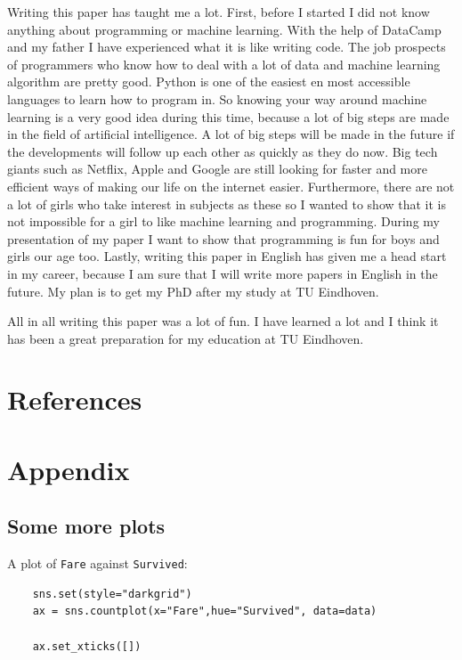 \documentclass[11pt]{article}
\begin{document}
Writing this paper has taught me a lot. First, before I started I did not know anything about programming or machine learning. With the help of DataCamp and my father I have experienced what it is like writing code. The job prospects of programmers who know how to deal with a lot of data and machine learning algorithm are pretty good. Python is one of the easiest en most accessible languages to learn how to program in. So knowing your way around machine learning is a very good idea during this time, because a lot of big steps are made in the field of artificial intelligence. A lot of big steps will be made in the future if the developments will follow up each other as quickly as they do now.  Big tech giants such as Netflix, Apple and Google are still looking for faster and more efficient ways of making our life on the internet easier.  Furthermore, there are not a lot of girls who take interest in subjects as these so I wanted to show that it is not impossible for a girl to like machine learning and programming. During my presentation of my paper I want to show that programming is fun for boys and girls our age too. Lastly, writing this paper in English has given me a head start in my career, because I am sure that I will write more papers in English in the future. My plan is to get my PhD after my study at TU Eindhoven. 

All in all writing this paper was a lot of fun. I have learned a lot and I think it has been a great preparation for my education at TU Eindhoven. 


\section{References}
\label{sec:orgb157a49}

\printbibliography


\newpage
\section{Appendix}
\label{sec:org1bfd487}
\label{sec:appendix}

\subsection{Some more plots}
\label{sec:org127d595}


A plot of \texttt{Fare} against \texttt{Survived}: 
\begin{verbatim}
    sns.set(style="darkgrid")
    ax = sns.countplot(x="Fare",hue="Survived", data=data)

    ax.set_xticks([])
    
    
\end{verbatim}
\end{document}
